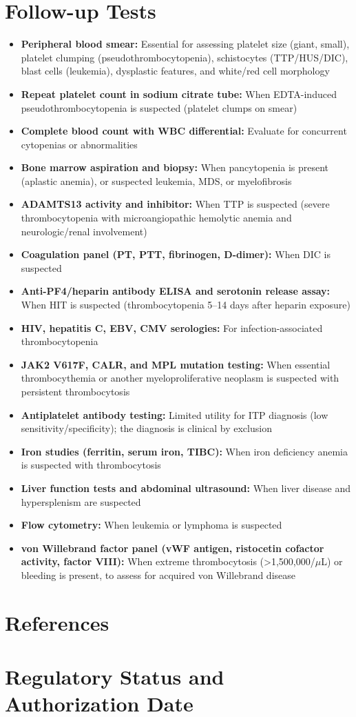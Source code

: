 \section*{Follow-up Tests}
\begin{itemize}
  \item \textbf{Peripheral blood smear:} Essential for assessing platelet size (giant, small), platelet clumping (pseudothrombocytopenia), schistocytes (TTP/HUS/DIC), blast cells (leukemia), dysplastic features, and white/red cell morphology
  \item \textbf{Repeat platelet count in sodium citrate tube:} When EDTA-induced pseudothrombocytopenia is suspected (platelet clumps on smear)
  \item \textbf{Complete blood count with WBC differential:} Evaluate for concurrent cytopenias or abnormalities
  \item \textbf{Bone marrow aspiration and biopsy:} When pancytopenia is present (aplastic anemia), or suspected leukemia, MDS, or myelofibrosis
  \item \textbf{ADAMTS13 activity and inhibitor:} When TTP is suspected (severe thrombocytopenia with microangiopathic hemolytic anemia and neurologic/renal involvement)
  \item \textbf{Coagulation panel (PT, PTT, fibrinogen, D-dimer):} When DIC is suspected
  \item \textbf{Anti-PF4/heparin antibody ELISA and serotonin release assay:} When HIT is suspected (thrombocytopenia 5--14 days after heparin exposure)
  \item \textbf{HIV, hepatitis C, EBV, CMV serologies:} For infection-associated thrombocytopenia
  \item \textbf{JAK2 V617F, CALR, and MPL mutation testing:} When essential thrombocythemia or another myeloproliferative neoplasm is suspected with persistent thrombocytosis
  \item \textbf{Antiplatelet antibody testing:} Limited utility for ITP diagnosis (low sensitivity/specificity); the diagnosis is clinical by exclusion
  \item \textbf{Iron studies (ferritin, serum iron, TIBC):} When iron deficiency anemia is suspected with thrombocytosis
  \item \textbf{Liver function tests and abdominal ultrasound:} When liver disease and hypersplenism are suspected
  \item \textbf{Flow cytometry:} When leukemia or lymphoma is suspected
  \item \textbf{von Willebrand factor panel (vWF antigen, ristocetin cofactor activity, factor VIII):} When extreme thrombocytosis (>1,500,000/$\mu$L) or bleeding is present, to assess for acquired von Willebrand disease
\end{itemize}

\section*{References}



\clearpage
\section*{Regulatory Status and Authorization Date}

\clearpage
